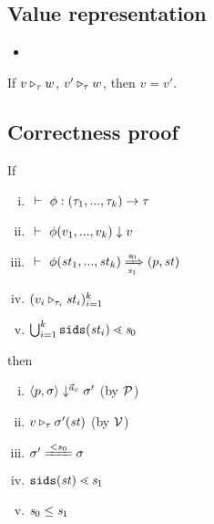 \subsection{Value representation}
\begin{itemize}

\item {}



\begin{comment}
\PT{
	\AC{\ValRep {\lrange{v_1}{v_k}} {\tau} {\v}}
	\UC{\ValRep {\Seqk{v}}{\tseq{\tau}}{(\v,\langle \F_1,..., \F_k, \T \rangle)}}
}\\[4ex]

\item \Jug{\ValRep{\lrange{v_1}{v_k}}{\tau}{\v}}
\PT{
	\Axiom{\ValRep{\lrange{n_1}{n_k}}{\int}{\vrange{n_1}{n_k}}}
}
\PT{
	\AC{\ValRep{v_i}{\tau}{\v}}
	\UC{\ValRep{\lrange{v_1}{v_k}}{\tseq{\tau}}{}}
}

\end{comment}

\end{itemize}

\begin{lem}
	If $v \triangleright_{\tau} w$, $v' \triangleright_{\tau} w$,
	then $v=v'$.
\end{lem}


\subsection{Correctness proof}
\begin{lem}
	\label{function-correctness}
	If 
	\begin{enumerate}[(i)]
	\item $\Type{} {\TypeF} {\Tupk{\tau} \-> \tau}$
	\item $\ \vdash\  \phi(v_1,...,v_k) \downarrow v$
	\item $\tranf{\st_1}{\st_k}{\s_0}{\s_1}{\sfun{p}{\st}}$
 	\item $(v_i \triangleright_{\tau_i} \mathit{st}_i)^k_{i=1}$
 	\item $\bigcup^k_{i=1}\mathtt{sids}(\mathit{st}_i) \lessdot \mathit{s}_0$
	\end{enumerate}
 	then 
 	\begin{enumerate}[(i)]
 		\item $\langle p,\sigma \rangle \downarrow^{\vec a_c} \sigma'$ (by $\mathcal{P}$)
 		\item $v \triangleright_{\tau} \sigma'(\mathit{st})$ (by $\mathcal{V}$)
 		\item $\sgm' \ConEq{s_0} \sgm $
 		\item $\mathtt{sids}(\mathit{st}) \lessdot \mathit{s}_1$
 		\item $\mathit{s}_0 \le \mathit{s}_1$
 	\end{enumerate}
\end{lem}


